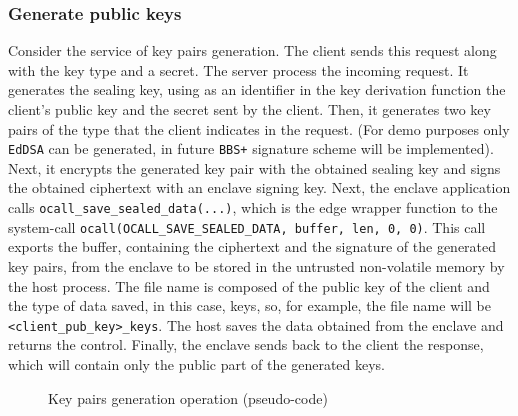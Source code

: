 \subsubsection{Generate public keys}
Consider the service of key pairs generation. The client sends this request along with the key type and a secret. The server process the incoming request. It generates the sealing key, using as an identifier in the key derivation function the client's public key and the secret sent by the client. Then, it generates two key pairs of the type that the client indicates in the request. (For demo purposes only \texttt{EdDSA} can be generated, in future \texttt{BBS+} signature scheme will be implemented). 
Next, it encrypts the generated key pair with the obtained sealing key and signs the obtained ciphertext with an enclave signing key. Next, the enclave application calls \texttt{ocall\_save\_sealed\_data(...)}, which is the edge wrapper function to the system-call \texttt{ocall(OCALL\_SAVE\_SEALED\_DATA, buffer, len, 0, 0)}. This call exports the buffer, containing the ciphertext and the signature of the generated key pairs, from the enclave to be stored in the untrusted non-volatile memory by the host process. The file name is composed of the public key of the client and the type of data saved, in this case, keys, so, for example, the file name will be \texttt{<client\_pub\_key>\_keys}. The host saves the data obtained from the enclave and returns the control. 
Finally, the enclave sends back to the client the response, which will contain only the public part of the generated keys. 

\begin{figure}[!h]
    \centering
    
    \caption{Key pairs generation operation (pseudo-code)}
    \label{poc-gen-keys}
\end{figure}
